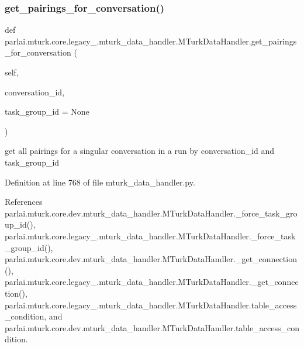 \subsubsection{\texorpdfstring{get\+\_\+pairings\+\_\+for\+\_\+conversation()}{get\_pairings\_for\_conversation()}}
{\footnotesize\ttfamily def parlai.\+mturk.\+core.\+legacy\+\_.\+mturk\+\_\+data\+\_\+handler.\+M\+Turk\+Data\+Handler.\+get\+\_\+pairings\+\_\+for\+\_\+conversation (\begin{DoxyParamCaption}\item[{}]{self,  }\item[{}]{conversation\+\_\+id,  }\item[{}]{task\+\_\+group\+\_\+id = {\ttfamily None} }\end{DoxyParamCaption})}

\begin{DoxyVerb}get all pairings for a singular conversation in a run by
conversation_id and task_group_id
\end{DoxyVerb}
 

Definition at line 768 of file mturk\+\_\+data\+\_\+handler.\+py.



References parlai.\+mturk.\+core.\+dev.\+mturk\+\_\+data\+\_\+handler.\+M\+Turk\+Data\+Handler.\+\_\+force\+\_\+task\+\_\+group\+\_\+id(), parlai.\+mturk.\+core.\+legacy\+\_.\+mturk\+\_\+data\+\_\+handler.\+M\+Turk\+Data\+Handler.\+\_\+force\+\_\+task\+\_\+group\+\_\+id(), parlai.\+mturk.\+core.\+dev.\+mturk\+\_\+data\+\_\+handler.\+M\+Turk\+Data\+Handler.\+\_\+get\+\_\+connection(), parlai.\+mturk.\+core.\+legacy\+\_.\+mturk\+\_\+data\+\_\+handler.\+M\+Turk\+Data\+Handler.\+\_\+get\+\_\+connection(), parlai.\+mturk.\+core.\+legacy\+\_.\+mturk\+\_\+data\+\_\+handler.\+M\+Turk\+Data\+Handler.\+table\+\_\+access\+\_\+condition, and parlai.\+mturk.\+core.\+dev.\+mturk\+\_\+data\+\_\+handler.\+M\+Turk\+Data\+Handler.\+table\+\_\+access\+\_\+condition.


